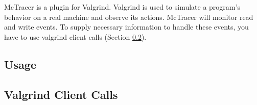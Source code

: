 McTracer is a plugin for Valgrind.
Valgrind is used to simulate a program's behavior on a real machine and observe its actions.
McTracer will monitor read and write events.
To supply necessary information to handle these events, you have to use valgrind client calls (Section \ref{vgclientcalls}).
\subsection{Usage} 
\subsection{Valgrind Client Calls} \label{vgclientcalls} 
